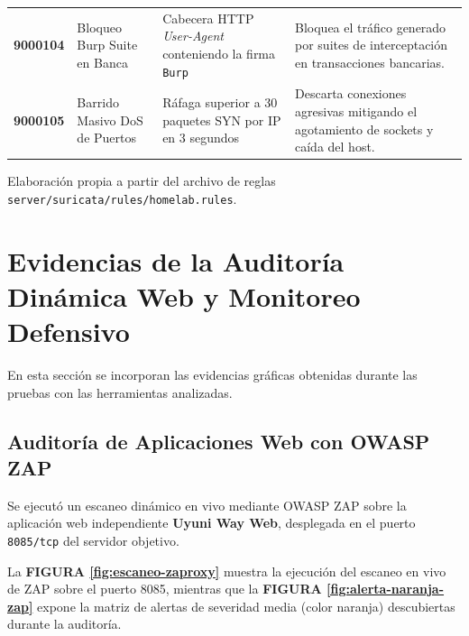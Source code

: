 \begin{table}[H]
{\begin{tablaAPA}
\begin{tabular}{C{1.6cm}L{3.6cm}L{5.0cm}L{4.8cm}}
  \textbf{9000104} & Bloqueo Burp Suite en Banca & Cabecera HTTP \textit{User-Agent} conteniendo la firma \texttt{Burp} & Bloquea el tráfico generado por suites de interceptación en transacciones bancarias. \\
  \textbf{9000105} & Barrido Masivo DoS de Puertos & Ráfaga superior a 30 paquetes SYN por IP en 3 segundos & Descarta conexiones agresivas mitigando el agotamiento de sockets y caída del host. \\
  \bottomrule
  \end{tabular}
  \end{tablaAPA}%
}{Elaboración propia a partir del archivo de reglas \texttt{server/suricata/rules/homelab.rules}.}
\end{table}

\section{Evidencias de la Auditoría Dinámica Web y Monitoreo Defensivo}

En esta sección se incorporan las evidencias gráficas obtenidas durante las pruebas con las herramientas analizadas.

\subsection{Auditoría de Aplicaciones Web con OWASP ZAP}

Se ejecutó un escaneo dinámico en vivo mediante OWASP ZAP sobre la aplicación web independiente \textbf{Uyuni Way Web}, desplegada en el puerto \texttt{8085/tcp} del servidor objetivo.

La \textbf{FIGURA \ref{fig:escaneo-zaproxy}} muestra la ejecución del escaneo en vivo de ZAP sobre el puerto 8085, mientras que la \textbf{FIGURA \ref{fig:alerta-naranja-zap}} expone la matriz de alertas de severidad media (color naranja) descubiertas durante la auditoría.




